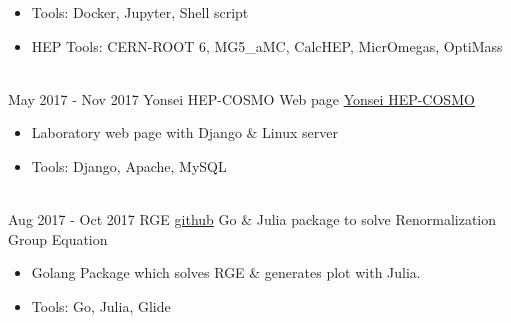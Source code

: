 \documentclass[letterpaper]{twentysecondcv} %
\begin{document}
\begin{twenty}
{\begin{itemize}
        \item Tools: Docker, Jupyter, Shell script
        
        \item HEP Tools: CERN-ROOT 6, MG5\_aMC, CalcHEP, MicrOmegas, OptiMass
 
		\end{itemize}
        }
        \\
    \twentyitem
    	{May 2017 -}
		{Nov 2017}
        {Yonsei HEP-COSMO Web page}
        {\href{http://nexus.yonsei.ac.kr/}{Yonsei HEP-COSMO}}
        {}
        {\begin{itemize}
        \item Laboratory web page with Django \& Linux server
        
        \item Tools: Django, Apache, MySQL
		\end{itemize}
        }
        \\
    \twentyitem
    	{Aug 2017 -}
		{Oct 2017}
        {RGE}
        {\href{https://github.com/Axect/RGE}{github}}
        {Go \& Julia package to solve Renormalization Group Equation}
        {\begin{itemize}
        \item Golang Package which solves RGE \& generates plot with Julia.
        
        \item Tools: Go, Julia, Glide
		\end{itemize}
        }
\end{twenty}
\end{document}
